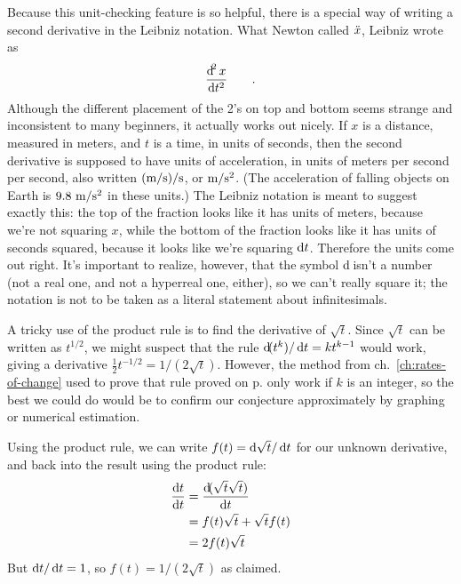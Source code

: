 Because this unit-checking feature is so helpful, there is a special way of writing a second
derivative in the Leibniz notation. What Newton called $\Ddot{x}$, Leibniz wrote as
\begin{equation*}
  \frac{\operatorname{d\!}^2 x}{\operatorname{d\!} t^2} \qquad .
\end{equation*}
Although the different placement of the 2's on top and bottom seems strange and inconsistent to many
beginners, it actually works out nicely.
If $x$ is a distance, measured in meters, and $t$ is a time, in units of seconds, then the
second derivative is supposed to have units of acceleration, in units of meters per second per
second, also written $(\textup{m}/\textup{s})/\textup{s}$, or $\textup{m}/\textup{s}^2$. (The acceleration of falling
objects on Earth is $9.8\ \munit/\sunit^2$ in these units.) The Leibniz notation is meant to suggest
exactly this: the top of the fraction looks like it has units of meters, because we're not squaring $x$,
while the bottom of the fraction looks like it has units of seconds squared, because it looks like we're
squaring $\operatorname{d\!} t$. Therefore the units come out right. It's important to realize, however, that
the symbol $\operatorname{d\!}$ isn't a number (not a real one, and not a hyperreal one, either), so we can't really
square it; the notation is not to be taken as a literal statement about infinitesimals.

\begin{eg}\label{eg:derivative-of-sqrt}
A tricky use of the product rule is to find the derivative of $\sqrt{t}$. Since $\sqrt{t}$ can be
written as $t^{1/2}$, we might suspect that the rule $\operatorname{d\!}(t^k)/\operatorname{d\!} t=kt^{k-1}$ would work,
giving a derivative $\frac{1}{2}t^{-1/2}=1/(2\sqrt{t})$. However, the method from ch.~\ref{ch:rates-of-change} used to prove
that rule proved on p.\pageref{detour:polynomial-proof} only work if $k$ is an integer, so the best we could do would be to confirm
our conjecture approximately by graphing or numerical estimation.

Using the product rule, we can write $f(t)=\operatorname{d\!}\sqrt{t}/\operatorname{d\!} t$ for our unknown derivative, and
back into the result using the product rule:
\begin{align*}
  \frac{\operatorname{d\!} t}{\operatorname{d\!} t} &= \frac{\operatorname{d\!}(\sqrt{t}\sqrt{t})}{\operatorname{d\!} t} \\
           &= f(t)\sqrt{t}+\sqrt{t}f(t) \\
           &= 2f(t)\sqrt{t}
\end{align*}
But $\operatorname{d\!} t/\operatorname{d\!} t=1$, so $f(t)=1/(2\sqrt{t})$ as claimed.
\end{eg}

